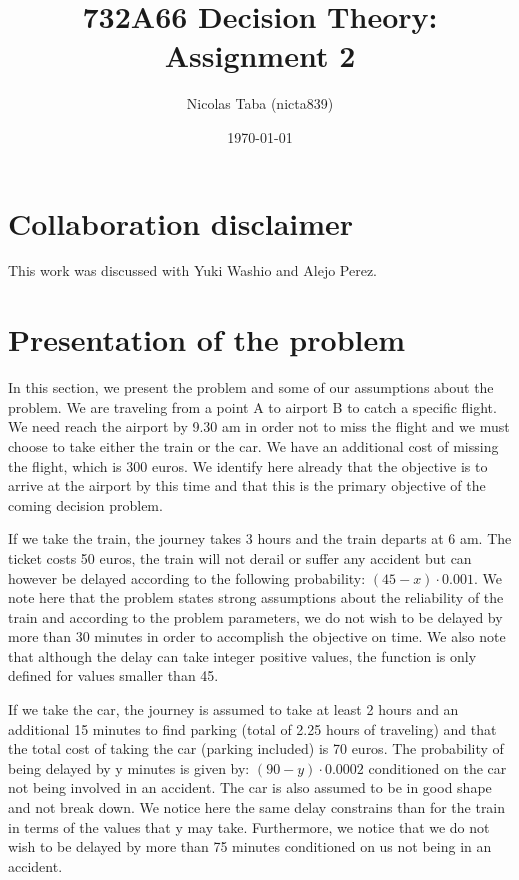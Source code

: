 \documentclass[letterpaper,12pt]{article}
\begin{document}
\title{732A66 Decision Theory: Assignment 2}
\author{Nicolas Taba (nicta839)}
\date{\today}
\maketitle



\section{Collaboration disclaimer}

This work was discussed with Yuki Washio and Alejo Perez.


\section{Presentation of the problem}

In this section, we present the problem and some of our assumptions about the problem. We are traveling from a point A to airport B to catch a specific flight. We need reach the airport by 9.30 am in order not to miss the flight and we must choose to take either the train or the car. We have an additional cost of missing the flight, which is 300 euros. We identify here already that the objective is to arrive at the airport by this time and that this is the primary objective of the coming decision problem.

If we take the train, the journey takes 3 hours and the train departs at 6 am. The ticket costs 50 euros, the train will not derail or suffer any accident but can however be delayed according to the following probability: $(45 - x) \cdot 0.001$. We note here that the problem states strong assumptions about the reliability of the train and according to the problem parameters, we do not wish to be delayed by more than 30 minutes in order to accomplish the objective on time. We also note that although the delay can take integer positive values, the function is only defined for values smaller than 45.

If we take the car, the journey is assumed to take at least 2 hours and an additional 15 minutes to find parking (total of 2.25 hours of traveling) and that the total cost of taking the car (parking included) is 70 euros. The probability of being delayed by y minutes is given by: $(90- y)\cdot 0.0002$ conditioned on the car not being involved in an accident. The car is also assumed to be in good shape and not break down. We notice here the same delay constrains than for the train in terms of the values that y may take. Furthermore, we notice that we do not wish to be delayed by more than 75 minutes conditioned on us not being in an accident.
\end{document}
